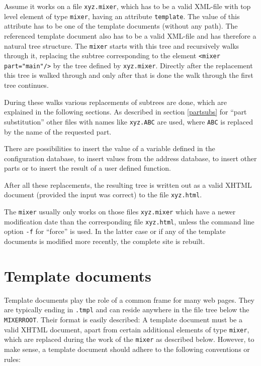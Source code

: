 \documentclass[a4paper,11pt]{article}
\newcommand{\mixer}{\texttt{mixer}}
\newcommand{\MIXERROOT}{\texttt{MIXERROOT}}
\begin{document}
Assume it works on a file \verb!xyz.mixer!, which has to be a valid
XML-file with top level element of type \verb!mixer!, having an
attribute \verb!template!. The value of this attribute has to be
one of the template documents (without any path). The referenced template
document also has to be a valid XML-file and has therefore a natural
tree structure. The {\mixer} starts with this tree and recursively
walks through it, replacing the subtree corresponding to the element
\verb!<mixer part="main"/>! by the tree defined by \verb!xyz.mixer!.
Directly after the replacement this tree is walked through and only
after that is done the walk through the first tree continues.

During these walks various replacements of subtrees are done, which are
explained in the following sections. As described in section \ref{partsubs}
for "`part substitution"' other files with names like \verb!xyz.ABC!
are used, where \verb!ABC! is replaced by the name of the requested
part.

There are possibilities to insert the value of a variable defined
in the configuration database, to insert values from the address
database, to insert other parts or to insert the result of a user
defined function.

After all these replacements, the resulting tree is written out as
a valid XHTML document (provided the input was correct) to the file
\verb!xyz.html!.

The {\mixer} usually only works on those files \verb!xyz.mixer! which
have a newer modification date than the corresponding file
\verb!xyz.html!, unless the command line option \verb!-f! for "`force"'
is used. In the latter case or if any of the template documents is 
modified more recently, the complete site is rebuilt.

\section{Template documents}
\label{templatedocs}

Template documents play the role of a common frame for many web pages.
They are typically ending in \verb!.tmpl! and can reside anywhere
in the file tree below the {\MIXERROOT}.
Their format is easily described: A template document
must be a valid XHTML document, apart from certain additional elements
of type \verb!mixer!, which are replaced during the work of the {\mixer}
as described below. However, to make sense, a template document should adhere
to the following conventions or rules:
\end{document}

